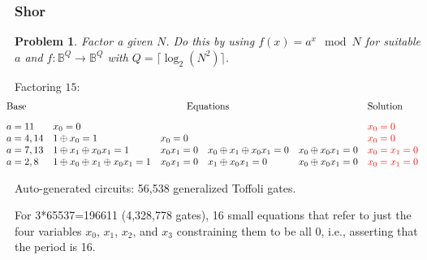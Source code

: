 \documentclass{beamer}
\newcommand{\red}[1]{{\color{red}{#1}}}
\newcommand{\Bool}{\ensuremath{\mathbb{B}}}
\newtheorem{prob}{Problem}
\begin{document}
\begin{frame}

  \frametitle{Shor}

\begin{prob}
  Factor a given $N$. Do this by using $f(x) = a^x \mod N$ for suitable $a$ and
  $f : \Bool^Q \rightarrow \Bool^Q$ with $Q = \lceil \log_2 \left(N^2\right) \rceil$.
\end{prob}

Factoring $15$:
\vspace*{-2mm}
{\tiny
\[\begin{array}{l@{\quad}lllll}
  \hspace*{-5mm}\textrm{Base} & \multicolumn{4}{c}{\textrm{Equations}} & \textrm{Solution} \\[2ex]
  \hspace*{-5mm} a=11 & x_0 = 0 &&&& \red{x_0 = 0} \\
  \hspace*{-5mm} a=4,14 & 1 \oplus x_0 = 1 & x_0 = 0 && & \red{x_0 = 0} \\
  \hspace*{-5mm} a=7,13 & 1 \oplus x_1 \oplus x_0x_1 = 1 & x_0x_1 = 0 & x_0 \oplus x_1 \oplus x_0x_1 = 0 &  x_0 \oplus x_0x_1 = 0 & \red{x_0=x_1=0} \\
  \hspace*{-5mm} a=2,8 & 1 \oplus x_0 \oplus x_1 \oplus x_0x_1 = 1 & x_0x_1 = 0 & x_1 \oplus x_0x_1 = 0 & x_0 \oplus x_0x_1 = 0  & \red{x_0=x_1=0}
\end{array}\]
}

  Auto-generated circuits: 56,538 generalized Toffoli gates. 

  \pause
  \vspace*{4mm}
  For 3*65537=196611 (4,328,778 gates),
   16 small equations that refer to just the four variables $x_0$, $x_1$, $x_2$, and $x_3$
constraining them to be all 0, i.e.,
asserting that the period is 16.
\end{frame}
\end{document}
